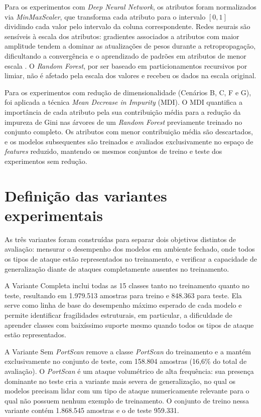 Para os experimentos com \textit{Deep Neural Network}, os atributos foram normalizados via \textit{MinMaxScaler}, que transforma cada atributo para o intervalo $[0, 1]$ dividindo cada valor pelo intervalo da coluna correspondente. Redes neurais são sensíveis à escala dos atributos: gradientes associados a atributos com maior amplitude tendem a dominar as atualizações de pesos durante a retropropagação, dificultando a convergência e o aprendizado de padrões em atributos de menor escala \cite{bochie2020sbrc}. O \textit{Random Forest}, por ser baseado em particionamentos recursivos por limiar, não é afetado pela escala dos valores e recebeu os dados na escala original.

Para os experimentos com redução de dimensionalidade (Cenários B, C, F e G), foi aplicada a técnica \textit{Mean Decrease in Impurity} (MDI). O MDI quantifica a importância de cada atributo pela sua contribuição média para a redução da impureza de Gini nas árvores de um \textit{Random Forest} previamente treinado no conjunto completo. Os atributos com menor contribuição média são descartados, e os modelos subsequentes são treinados e avaliados exclusivamente no espaço de \textit{features} reduzido, mantendo os mesmos conjuntos de treino e teste dos experimentos sem redução.

\section{Definição das variantes experimentais}

As três variantes foram construídas para separar dois objetivos distintos de avaliação: mensurar o desempenho dos modelos em ambiente fechado, onde todos os tipos de ataque estão representados no treinamento, e verificar a capacidade de generalização diante de ataques completamente ausentes no treinamento.

A Variante Completa inclui todas as 15 classes tanto no treinamento quanto no teste, resultando em 1.979.513 amostras para treino e 848.363 para teste. Ela serve como linha de base do desempenho máximo esperado de cada modelo e permite identificar fragilidades estruturais, em particular, a dificuldade de aprender classes com baixíssimo suporte mesmo quando todos os tipos de ataque estão representados.

A Variante Sem \textit{PortScan} remove a classe \textit{PortScan} do treinamento e a mantém exclusivamente no conjunto de teste, com 158.804 amostras (16,6\% do total de avaliação). O \textit{PortScan} é um ataque volumétrico de alta frequência: sua presença dominante no teste cria a variante mais severa de generalização, no qual os modelos precisam lidar com um tipo de ataque numericamente relevante para o qual não possuem nenhum exemplo de treinamento. O conjunto de treino nessa variante contém 1.868.545 amostras e o de teste 959.331.


